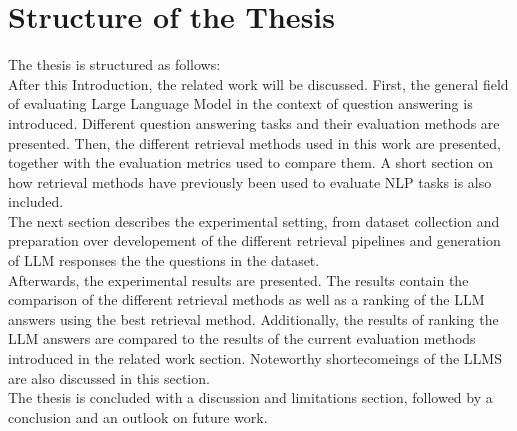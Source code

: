 \section{Structure of the Thesis}\label{sec:structure-of-the-thesis}
The thesis is structured as follows:\\
After this Introduction, the related work will be discussed.
First, the general field of evaluating Large Language Model in the context of question answering is introduced.
Different question answering tasks and their evaluation methods are presented.
Then, the different retrieval methods used in this work are presented, together with the evaluation metrics used to compare them.
A short section on how retrieval methods have previously been used to evaluate NLP tasks is also included.
\\
The next section describes the experimental setting, from dataset collection and preparation over developement of the different retrieval pipelines and generation of LLM responses the the questions in the dataset.
\\
Afterwards, the experimental results are presented. The results contain the comparison of the different retrieval methods as well as a ranking of the LLM answers using the best retrieval method.
Additionally, the results of ranking the LLM answers are compared to the results of the current evaluation methods introduced in the related work section.
Noteworthy shortecomeings of the LLMS are also discussed in this section.
\\
The thesis is concluded with a discussion and limitations section, followed by a conclusion and an outlook on future work.